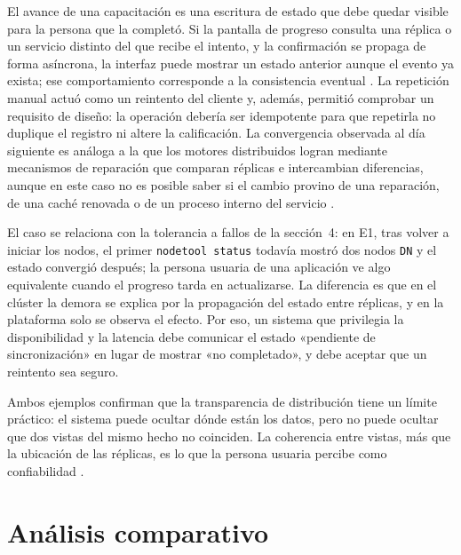 \documentclass[11pt,a4paper]{article}
\begin{document}
El avance de una capacitación es una escritura de estado que debe quedar visible para
la persona que la completó. Si la pantalla de progreso consulta una réplica o un
servicio distinto del que recibe el intento, y la confirmación se propaga de forma
asíncrona, la interfaz puede mostrar un estado anterior aunque el evento ya exista;
ese comportamiento corresponde a la consistencia eventual
\cite{apacheCassandraGuarantees,ferreira2024consistency}. La repetición manual actuó
como un reintento del cliente y, además, permitió comprobar un requisito de diseño:
la operación debería ser idempotente para que repetirla no duplique el registro ni
altere la calificación. La convergencia observada al día siguiente es análoga a la
que los motores distribuidos logran mediante mecanismos de reparación que comparan
réplicas e intercambian diferencias, aunque en este caso no es posible saber si el
cambio provino de una reparación, de una caché renovada o de un proceso interno del
servicio \cite{apacheCassandraRepair}.

El caso se relaciona con la tolerancia a fallos de la sección~4: en E1, tras volver a
iniciar los nodos, el primer \texttt{nodetool status} todavía mostró dos nodos
\texttt{DN} y el estado convergió después; la persona usuaria de una aplicación ve
algo equivalente cuando el progreso tarda en actualizarse. La diferencia es que en
el clúster la demora se explica por la propagación del estado entre réplicas, y en la
plataforma solo se observa el efecto. Por eso, un sistema que privilegia la
disponibilidad y la latencia debe comunicar el estado «pendiente de sincronización»
en lugar de mostrar «no completado», y debe aceptar que un reintento sea seguro.

Ambos ejemplos confirman que la transparencia de distribución tiene un límite
práctico: el sistema puede ocultar dónde están los datos, pero no puede ocultar que
dos vistas del mismo hecho no coinciden. La coherencia entre vistas, más que la
ubicación de las réplicas, es lo que la persona usuaria percibe como confiabilidad
\cite{apacheCassandraDynamo,cockroachlabsReplication}.

\section{Análisis comparativo}
\end{document}
